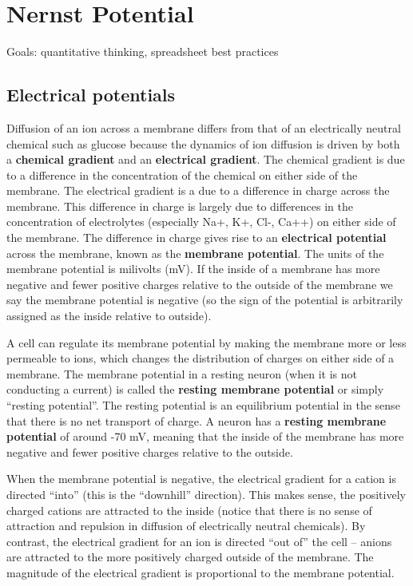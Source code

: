\documentclass[]{book}
\begin{document}
\chapter{Nernst Potential}\label{nernst-potential}

Goals: quantitative thinking, spreadsheet best practices

\section{Electrical potentials}\label{electrical-potentials}

Diffusion of an ion across a membrane differs from that of an
electrically neutral chemical such as glucose because the dynamics of
ion diffusion is driven by both a \textbf{chemical gradient} and an
\textbf{electrical gradient}. The chemical gradient is due to a
difference in the concentration of the chemical on either side of the
membrane. The electrical gradient is a due to a difference in charge
across the membrane. This difference in charge is largely due to
differences in the concentration of electrolytes (especially Na+, K+,
Cl-, Ca++) on either side of the membrane. The difference in charge
gives rise to an \textbf{electrical potential} across the membrane,
known as the \textbf{membrane potential}. The units of the membrane
potential is milivolts (mV). If the inside of a membrane has more
negative and fewer positive charges relative to the outside of the
membrane we say the membrane potential is negative (so the sign of the
potential is arbitrarily assigned as the inside relative to outside).

A cell can regulate its membrane potential by making the membrane more
or less permeable to ions, which changes the distribution of charges on
either side of a membrane. The membrane potential in a resting neuron
(when it is not conducting a current) is called the \textbf{resting
membrane potential} or simply ``resting potential''. The resting
potential is an equilibrium potential in the sense that there is no net
transport of charge. A neuron has a \textbf{resting membrane potential}
of around -70 mV, meaning that the inside of the membrane has more
negative and fewer positive charges relative to the outside.

When the membrane potential is negative, the electrical gradient for a
cation is directed ``into'' (this is the ``downhill'' direction). This
makes sense, the positively charged cations are attracted to the inside
(notice that there is no sense of attraction and repulsion in diffusion
of electrically neutral chemicals). By contrast, the electrical gradient
for an ion is directed ``out of'' the cell -- anions are attracted to
the more positively charged outside of the membrane. The magnitude of
the electrical gradient is proportional to the membrane potential.
\end{document}
